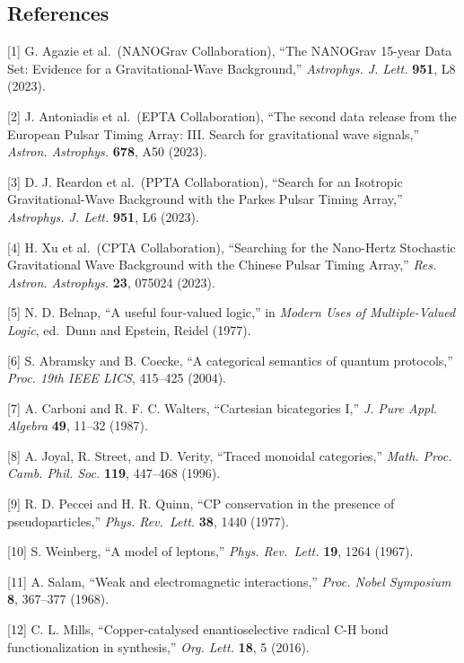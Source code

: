 \hypertarget{references}{%
\subsection{References}\label{references}}

{[}1{]} G. Agazie et al.~(NANOGrav Collaboration), ``The NANOGrav
15-year Data Set: Evidence for a Gravitational-Wave Background,''
\emph{Astrophys. J. Lett.} \textbf{951}, L8 (2023).

{[}2{]} J. Antoniadis et al.~(EPTA Collaboration), ``The second data
release from the European Pulsar Timing Array: III. Search for
gravitational wave signals,'' \emph{Astron. Astrophys.} \textbf{678},
A50 (2023).

{[}3{]} D. J. Reardon et al.~(PPTA Collaboration), ``Search for an
Isotropic Gravitational-Wave Background with the Parkes Pulsar Timing
Array,'' \emph{Astrophys. J. Lett.} \textbf{951}, L6 (2023).

{[}4{]} H. Xu et al.~(CPTA Collaboration), ``Searching for the
Nano-Hertz Stochastic Gravitational Wave Background with the Chinese
Pulsar Timing Array,'' \emph{Res. Astron. Astrophys.} \textbf{23},
075024 (2023).

{[}5{]} N. D. Belnap, ``A useful four-valued logic,'' in \emph{Modern
Uses of Multiple-Valued Logic}, ed.~Dunn and Epstein, Reidel (1977).

{[}6{]} S. Abramsky and B. Coecke, ``A categorical semantics of quantum
protocols,'' \emph{Proc. 19th IEEE LICS}, 415--425 (2004).

{[}7{]} A. Carboni and R. F. C. Walters, ``Cartesian bicategories I,''
\emph{J. Pure Appl. Algebra} \textbf{49}, 11--32 (1987).

{[}8{]} A. Joyal, R. Street, and D. Verity, ``Traced monoidal
categories,'' \emph{Math. Proc. Camb. Phil. Soc.} \textbf{119}, 447--468
(1996).

{[}9{]} R. D. Peccei and H. R. Quinn, ``CP conservation in the presence
of pseudoparticles,'' \emph{Phys. Rev.~Lett.} \textbf{38}, 1440 (1977).

{[}10{]} S. Weinberg, ``A model of leptons,'' \emph{Phys. Rev.~Lett.}
\textbf{19}, 1264 (1967).

{[}11{]} A. Salam, ``Weak and electromagnetic interactions,''
\emph{Proc. Nobel Symposium} \textbf{8}, 367--377 (1968).

{[}12{]} C. L. Mills, ``Copper-catalysed enantioselective radical C-H
bond functionalization in synthesis,'' \emph{Org. Lett.} \textbf{18}, 5
(2016).
